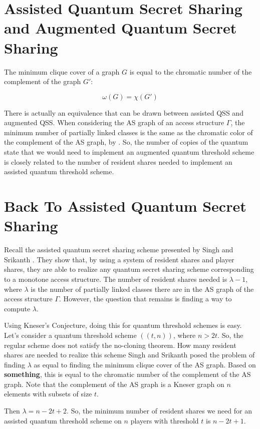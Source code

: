 \section{Assisted Quantum Secret Sharing and Augmented Quantum Secret Sharing}

\begin{theorem}
    \label{thm:chrom-clique}
    The minimum clique cover of a graph $G$ is equal to the chromatic number of the complement of the graph $G'$:
    
    \[\omega(G) = \chi(G')\]
\end{theorem}

There is actually an equivalence that can be drawn between assisted QSS and augmented QSS. When considering the AS graph of an access structure $\Gamma$, the minimum number of partially linked classes is the same as the chromatic color of the complement of the AS graph, by . So, the number of copies of the quantum state that we would need to implement an augmented quantum threshold scheme is closely related to the number of resident shares needed to implement an assisted quantum threshold scheme.

\section{Back To Assisted Quantum Secret Sharing}

Recall the assisted quantum secret sharing scheme presented by Singh and Srikanth \cite{singh_assisted_2004}. They show that, by using a system of resident shares and player shares, they are able to realize any quantum secret sharing scheme corresponding to a monotone access structure. The number of resident shares needed is $\lambda-1$, where $\lambda$ is the number of partially linked classes there are in the AS graph of the access structure $\Gamma$. However, the question that remains is finding a way to compute $\lambda$.

Using Kneser's Conjecture, doing this for quantum threshold schemes is easy. Let's consider a quantum threshold scheme $((t,n))$, where $n > 2t$. So, the regular scheme does not satisfy the no-cloning theorem. How many resident shares are needed to realize this scheme Singh and Srikanth posed the problem of finding $\lambda$ as equal to finding the minimum clique cover of the AS graph. Based on \textbf{something}, this is equal to the chromatic number of the complement of the AS graph. Note that the complement of the AS graph is a Kneser graph on $n$ elements with subsets of size $t$.

Then $\lambda = n-2t+2$. So, the minimum number of resident shares we need for an assisted quantum threshold scheme on $n$ players with threshold $t$ is $n-2t+1$.